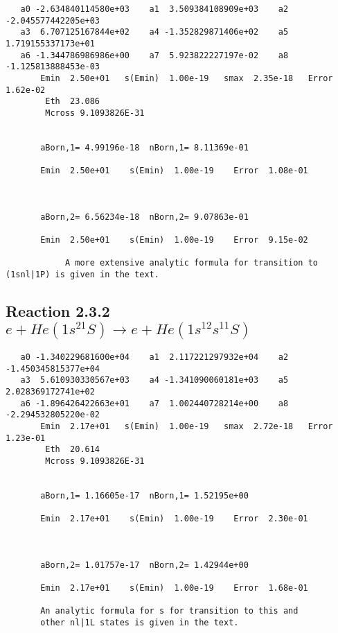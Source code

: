 \documentclass[12pt,dvipdfm]{article}
\begin{document}
\begin{small}\begin{verbatim}
   a0 -2.634840114580e+03    a1  3.509384108909e+03    a2 -2.045577442205e+03
   a3  6.707125167844e+02    a4 -1.352829871406e+02    a5  1.719155337173e+01
   a6 -1.344786986986e+00    a7  5.923822227197e-02    a8 -1.125813888453e-03
       Emin  2.50e+01   s(Emin)  1.00e-19   smax  2.35e-18   Error  1.62e-02
        Eth  23.086
        Mcross 9.1093826E-31


       aBorn,1= 4.99196e-18  nBorn,1= 8.11369e-01

       Emin  2.50e+01    s(Emin)  1.00e-19    Error  1.08e-01



       aBorn,2= 6.56234e-18  nBorn,2= 9.07863e-01

       Emin  2.50e+01    s(Emin)  1.00e-19    Error  9.15e-02

            A more extensive analytic formula for transition to (1snl|1P) is given in the text.
\end{verbatim}\end{small}






\newpage
\subsection{
Reaction 2.3.2 $e + He(1s^21S) \rightarrow e + He(1s^12s^11S)$}

















\begin{small}\begin{verbatim}
   a0 -1.340229681600e+04    a1  2.117221297932e+04    a2 -1.450345815377e+04
   a3  5.610930330567e+03    a4 -1.341090060181e+03    a5  2.028369172741e+02
   a6 -1.896426422663e+01    a7  1.002440728214e+00    a8 -2.294532805220e-02
       Emin  2.17e+01   s(Emin)  1.00e-19   smax  2.72e-18   Error  1.23e-01
        Eth  20.614
        Mcross 9.1093826E-31


       aBorn,1= 1.16605e-17  nBorn,1= 1.52195e+00

       Emin  2.17e+01    s(Emin)  1.00e-19    Error  2.30e-01



       aBorn,2= 1.01757e-17  nBorn,2= 1.42944e+00

       Emin  2.17e+01    s(Emin)  1.00e-19    Error  1.68e-01

       An analytic formula for s for transition to this and
       other nl|1L states is given in the text.
\end{verbatim}\end{small}
\end{document}
